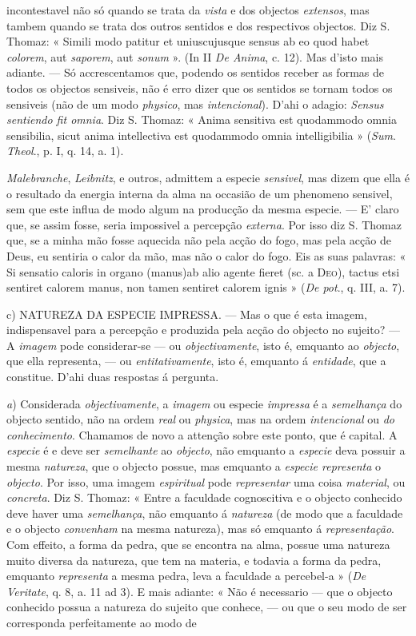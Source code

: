 incontestavel não só quando se trata da \emph{vista} e dos objectos \emph{extensos}, mas tambem quando se trata dos outros sentidos e dos respectivos objectos. Diz S. Thomaz: « Simili modo patitur et uniuscujusque sensus ab eo quod habet \emph{colorem}, aut \emph{saporem}, aut \emph{sonum} ». (In II \emph{De Anima}, c. 12). Mas d'isto mais adiante. --- Só accrescentamos que, podendo os sentidos receber as formas de todos os objectos sensiveis, não é erro dizer que os sentidos se tornam todos os sensiveis (não de um modo \emph{physico}, mas \emph{intencional}). D'ahi o adagio: \emph{Sensus sentiendo fit omnia}. Diz S. Thomaz: « Anima sensitiva est quodammodo omnia sensibilia, sicut anima intellectiva est quodammodo omnia intelligibilia » (\emph{Sum}. \emph{Theol}., p. I, q. 14, a. 1).\par \emph{Malebranche}, \emph{Leibnitz}, e outros, admittem a especie \emph{sensivel}, mas dizem que ella é o resultado da energia interna da alma na occasião de um phenomeno sensivel, sem que este influa de modo algum na producção da mesma especie. --- E' claro que, se assim fosse, seria impossivel a percepção \emph{externa}. Por isso diz S. Thomaz que, se a minha mão fosse aquecida não pela acção do fogo, mas pela acção de Deus, eu sentiria o calor da mão, mas não o calor do fogo. Eis as suas palavras: « Si sensatio caloris in organo (manus)ab alio agente fieret (sc. a \textsc{Deo}), tactus etsi sentiret calorem manus, non tamen sentiret calorem ignis » (\emph{De pot}., q. III, a. 7).\par c) \textsc{NATUREZA} DA ESPECIE IMPRESSA. --- Mas o que é esta imagem, indispensavel para a percepção e produzida pela acção do objecto no sujeito? --- A \emph{imagem} pode considerar-se --- ou \emph{objectivamente}, isto é, emquanto ao \emph{objecto}, que ella representa, --- ou \emph{entitativamente}, isto é, emquanto á \emph{entidade}, que a constitue. D'ahi duas respostas á pergunta.\par \emph{a}) Considerada \emph{objectivamente}, a \emph{imagem} ou especie \emph{impressa} é a \emph{semelhança} do objecto sentido, não na ordem \emph{real} ou \emph{physica}, mas na ordem \emph{intencional} ou \emph{do conhecimento}. Chamamos de novo a attenção sobre este ponto, que é capital. A \emph{especie} é e deve ser \emph{semelhante} ao \emph{objecto}, não emquanto a \emph{especie} deva possuir a mesma \emph{natureza}, que o objecto possue, mas emquanto a \emph{especie representa} o \emph{objecto}. Por isso, uma imagem \emph{espiritual} pode \emph{representar} uma coisa \emph{material}, ou \emph{concreta}. Diz S. Thomaz: « Entre a faculdade cognoscitiva e o objecto conhecido deve haver uma \emph{semelhança}, não emquanto á \emph{natureza} (de modo que a faculdade e o objecto \emph{convenham} na mesma natureza), mas só emquanto á \emph{representação}. Com effeito, a forma da pedra, que se encontra na alma, possue uma natureza muito diversa da natureza, que tem na materia, e todavia a forma da pedra, emquanto \emph{representa} a mesma pedra, leva a faculdade a percebel-a » (\emph{De Veritate}, q. 8, a. 11 ad 3). E mais adiante: « Não é necessario --- que o objecto conhecido possua a natureza do sujeito que conhece, --- ou que o seu modo de ser corresponda perfeitamente ao modo de 